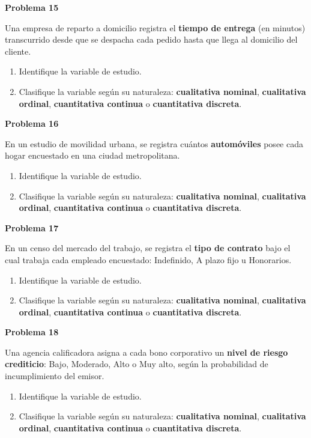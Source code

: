 \documentclass[10pt,letterpaper]{article}
\newcommand{\problema}[1]{%
  \vspace{2pt}%
  \begin{tcolorbox}[
    enhanced,
    colback=white,
    colframe=black,
    arc=0pt,
    boxrule=0pt,
    leftrule=2pt,
    left=6pt, right=6pt,
    top=1pt, bottom=1pt,
  ]
    {\normalsize\bfseries\sffamily #1}
  \end{tcolorbox}%
  \vspace{1pt}%
}
\begin{document}
\problema{Problema 15}
\noindent\sffamily\small Una empresa de reparto a domicilio registra el \textbf{tiempo de entrega} (en minutos) transcurrido desde que se despacha cada pedido hasta que llega al domicilio del cliente.
\begin{enumerate}[leftmargin=1.2cm, label=\textbf{\alph*)}, itemsep=0pt, topsep=2pt]
  \item Identifique la variable de estudio.
  \item Clasifique la variable seg\'un su naturaleza: \textbf{cualitativa nominal}, \textbf{cualitativa ordinal}, \textbf{cuantitativa continua} o \textbf{cuantitativa discreta}.
\end{enumerate}

\problema{Problema 16}
\noindent\sffamily\small En un estudio de movilidad urbana, se registra cu\'antos \textbf{autom\'oviles} posee cada hogar encuestado en una ciudad metropolitana.
\begin{enumerate}[leftmargin=1.2cm, label=\textbf{\alph*)}, itemsep=0pt, topsep=2pt]
  \item Identifique la variable de estudio.
  \item Clasifique la variable seg\'un su naturaleza: \textbf{cualitativa nominal}, \textbf{cualitativa ordinal}, \textbf{cuantitativa continua} o \textbf{cuantitativa discreta}.
\end{enumerate}

\problema{Problema 17}
\noindent\sffamily\small En un censo del mercado del trabajo, se registra el \textbf{tipo de contrato} bajo el cual trabaja cada empleado encuestado: Indefinido, A plazo fijo u Honorarios.
\begin{enumerate}[leftmargin=1.2cm, label=\textbf{\alph*)}, itemsep=0pt, topsep=2pt]
  \item Identifique la variable de estudio.
  \item Clasifique la variable seg\'un su naturaleza: \textbf{cualitativa nominal}, \textbf{cualitativa ordinal}, \textbf{cuantitativa continua} o \textbf{cuantitativa discreta}.
\end{enumerate}

\problema{Problema 18}
\noindent\sffamily\small Una agencia calificadora asigna a cada bono corporativo un \textbf{nivel de riesgo crediticio}: Bajo, Moderado, Alto o Muy alto, seg\'un la probabilidad de incumplimiento del emisor.
\begin{enumerate}[leftmargin=1.2cm, label=\textbf{\alph*)}, itemsep=0pt, topsep=2pt]
  \item Identifique la variable de estudio.
  \item Clasifique la variable seg\'un su naturaleza: \textbf{cualitativa nominal}, \textbf{cualitativa ordinal}, \textbf{cuantitativa continua} o \textbf{cuantitativa discreta}.
\end{enumerate}
\end{document}

